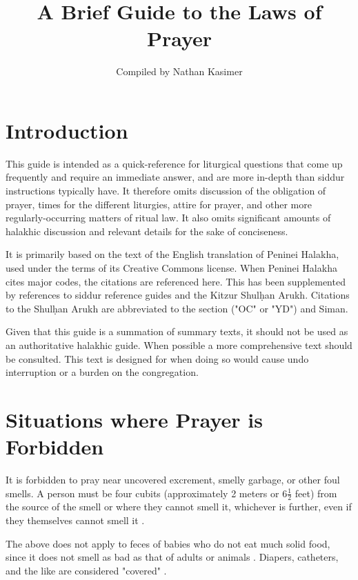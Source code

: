 \documentclass[11pt]{article}
\begin{document}
	
\title{A Brief Guide to the Laws of Prayer}

\author{Compiled by Nathan Kasimer}

\date{}

\maketitle


\section{Introduction}

This guide is intended as a quick-reference for liturgical questions that come up frequently and require an immediate answer, and are more in-depth than siddur instructions typically have. It therefore omits discussion of the obligation of prayer, times for the different liturgies, attire for prayer, and other more regularly-occurring matters of ritual law.  It also omits significant amounts of halakhic discussion and relevant details for the sake of conciseness.

It is primarily based on the text of the English translation of Peninei Halakha, used under the terms of its Creative Commons license.  When Peninei Halakha cites major codes, the citations are referenced here. This has been supplemented by references to siddur reference guides and the Kitzur Shul\d{h}an Arukh.  Citations to the Shul\d{h}an Arukh are abbreviated to the section  ("OC" or "YD") and Siman.

Given that this guide is a summation of summary texts, it should not be used as an authoritative halakhic guide. When possible a more comprehensive text should be consulted.  This text is designed for when doing so would cause undo interruption or a burden on the congregation.

\section{Situations where Prayer is Forbidden}

It is forbidden to pray near uncovered excrement, smelly garbage, or other foul smells.  A person must be four cubits (approximately 2 meters or 6$\frac{1}{2}$ feet) from the source of the smell or where they cannot smell it, whichever is further, even if they themselves cannot smell it \parencite*[3:9 citing OC 79]{PH}.%

The above does not apply to feces of babies who do not eat much solid food, since it does not smell as bad as that of adults or animals \parencite*[4:3 citing OC 81]{PH}. Diapers, catheters, and the like are considered "covered" \parencite*[4:4]{PH}.
\end{document}
